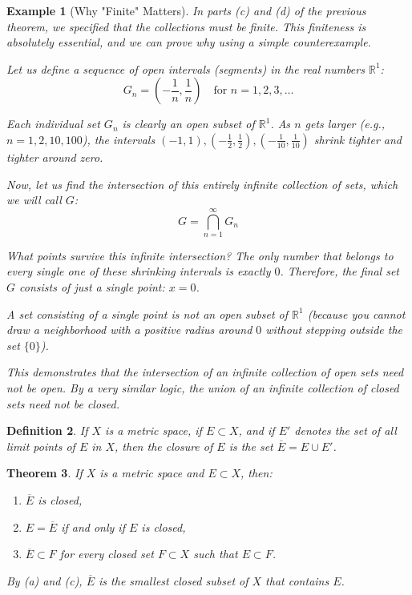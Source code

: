 \documentclass{article}
\theoremstyle{mythm}
\newtheorem{theorem}{Theorem}[section]
\newtheorem{definition}[theorem]{Definition}
\newtheorem{example}[theorem]{Example}
\begin{document}
\begin{example}[Why "Finite" Matters]
In parts (c) and (d) of the previous theorem, we specified that the collections must be finite. This finiteness is absolutely essential, and we can prove why using a simple counterexample. 

Let us define a sequence of open intervals (segments) in the real numbers $\mathbb{R}^1$:
\[ G_n = \left(-\frac{1}{n}, \frac{1}{n}\right) \quad \text{for } n = 1, 2, 3, \dots \]

Each individual set $G_n$ is clearly an open subset of $\mathbb{R}^1$. 
As $n$ gets larger (e.g., $n=1, 2, 10, 100$), the intervals $(-1, 1), (-\frac{1}{2}, \frac{1}{2}), (-\frac{1}{10}, \frac{1}{10})$ shrink tighter and tighter around zero.

Now, let us find the intersection of this entirely infinite collection of sets, which we will call $G$:
\[ G = \bigcap_{n=1}^\infty G_n \]

What points survive this infinite intersection? The only number that belongs to \textit{every single} one of these shrinking intervals is exactly $0$. Therefore, the final set $G$ consists of just a single point: $x = 0$. 

A set consisting of a single point is not an open subset of $\mathbb{R}^1$ (because you cannot draw a neighborhood with a positive radius around $0$ without stepping outside the set $\{0\}$). 

This demonstrates that the intersection of an \textit{infinite} collection of open sets need not be open. By a very similar logic, the union of an \textit{infinite} collection of closed sets need not be closed.
\end{example}
\begin{definition}
If $X$ is a metric space, if $E \subset X$, and if $E'$ denotes the set of all limit points of $E$ in $X$, then the \textit{closure} of $E$ is the set $\overline{E} = E \cup E'$.
\end{definition}

\begin{theorem}
If $X$ is a metric space and $E \subset X$, then:
\begin{enumerate}[label=(\alph*)]
    \item $\overline{E}$ is closed,
    \item $E = \overline{E}$ if and only if $E$ is closed,
    \item $\overline{E} \subset F$ for every closed set $F \subset X$ such that $E \subset F$.
\end{enumerate}
By (a) and (c), $\overline{E}$ is the smallest closed subset of $X$ that contains $E$.
\end{theorem}
\end{document}
